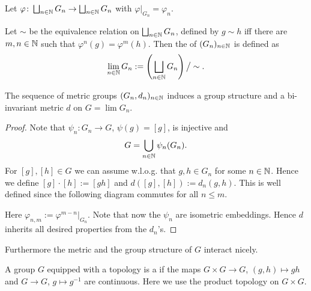 Let $\varphi\colon\bigsqcup_{n\in\mathbb{N}} G_n\to\bigsqcup_{n\in\mathbb{N}} G_n$ with $\varphi|_{G_n}=\varphi_n$.
\begin{definition}
Let $\sim$ be the equivalence relation on $\bigsqcup_{n\in\mathbb{N}} G_n$, defined by $g\sim h$ iff there are $m,n\in\mathbb{N}$ such that $\varphi^n(g)=\varphi^m(h)$.
Then the  of $(G_n)_{n\in\mathbb{N}}$ is defined as
\[\lim_{n\in\mathbb{N}} G_n:=\left(\bigsqcup_{n\in\mathbb{N}} G_n\right)\big/\sim.\]
\end{definition}
\begin{lemma}
The sequence of metric groups $(G_n,d_n)_{n\in\mathbb{N}}$ induces a group structure and a bi-invariant metric $d$ on $G=\lim G_n$. 
\end{lemma}
\begin{proof}
Note that $\psi_n\colon G_n\to G$, $\psi(g)=[g]$, is injective and \[G=\bigcup_{n\in\mathbb{N}}\psi_n(G_n).\]
For $[g], [h]\in G$ we can assume w.l.o.g. that $g,h\in G_n$ for some $n\in\mathbb{N}$. Hence we define $[g]\cdot[h]:=[gh]$ and $d([g],[h]):=d_n(g,h)$. This is well defined since the following diagram commutes for all $n\leq m$.
\begin{center}
\end{center}
Here $\varphi_{n,m}:=\varphi^{m-n}|_{G_n}$. Note that now the $\psi_n$ are isometric embeddings. Hence $d$ inherits all desired properties from the $d_n$'s. 
\end{proof}

Furthermore the metric and the group structure of $G$ interact nicely.
\begin{definition}
A group $G$ equipped with a topology is a  if 
the maps $G\times G\to G$, $(g,h)\mapsto gh$ and
 $G\to G$, $g\mapsto g^{-1}$ are continuous. Here we use the product topology on $G\times G$.
\end{definition}

